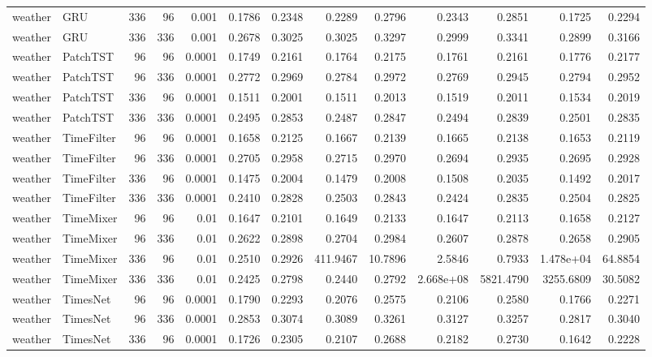 \begin{longtable}{@{}llrrr*{8}{r}@{}}
weather & GRU & 336 & 96 & 0.001 & 0.1786 & 0.2348 & 0.2289 & 0.2796 & 0.2343 & 0.2851 & 0.1725 & 0.2294 \\
weather & GRU & 336 & 336 & 0.001 & 0.2678 & 0.3025 & 0.3025 & 0.3297 & 0.2999 & 0.3341 & 0.2899 & 0.3166 \\
weather & PatchTST & 96 & 96 & 0.0001 & 0.1749 & 0.2161 & 0.1764 & 0.2175 & 0.1761 & 0.2161 & 0.1776 & 0.2177 \\
weather & PatchTST & 96 & 336 & 0.0001 & 0.2772 & 0.2969 & 0.2784 & 0.2972 & 0.2769 & 0.2945 & 0.2794 & 0.2952 \\
weather & PatchTST & 336 & 96 & 0.0001 & 0.1511 & 0.2001 & 0.1511 & 0.2013 & 0.1519 & 0.2011 & 0.1534 & 0.2019 \\
weather & PatchTST & 336 & 336 & 0.0001 & 0.2495 & 0.2853 & 0.2487 & 0.2847 & 0.2494 & 0.2839 & 0.2501 & 0.2835 \\
weather & TimeFilter & 96 & 96 & 0.0001 & 0.1658 & 0.2125 & 0.1667 & 0.2139 & 0.1665 & 0.2138 & 0.1653 & 0.2119 \\
weather & TimeFilter & 96 & 336 & 0.0001 & 0.2705 & 0.2958 & 0.2715 & 0.2970 & 0.2694 & 0.2935 & 0.2695 & 0.2928 \\
weather & TimeFilter & 336 & 96 & 0.0001 & 0.1475 & 0.2004 & 0.1479 & 0.2008 & 0.1508 & 0.2035 & 0.1492 & 0.2017 \\
weather & TimeFilter & 336 & 336 & 0.0001 & 0.2410 & 0.2828 & 0.2503 & 0.2843 & 0.2424 & 0.2835 & 0.2504 & 0.2825 \\
weather & TimeMixer & 96 & 96 & 0.01 & 0.1647 & 0.2101 & 0.1649 & 0.2133 & 0.1647 & 0.2113 & 0.1658 & 0.2127 \\
weather & TimeMixer & 96 & 336 & 0.01 & 0.2622 & 0.2898 & 0.2704 & 0.2984 & 0.2607 & 0.2878 & 0.2658 & 0.2905 \\
weather & TimeMixer & 336 & 96 & 0.01 & 0.2510 & 0.2926 & 411.9467 & 10.7896 & 2.5846 & 0.7933 & 1.478e+04 & 64.8854 \\
weather & TimeMixer & 336 & 336 & 0.01 & 0.2425 & 0.2798 & 0.2440 & 0.2792 & 2.668e+08 & 5821.4790 & 3255.6809 & 30.5082 \\
weather & TimesNet & 96 & 96 & 0.0001 & 0.1790 & 0.2293 & 0.2076 & 0.2575 & 0.2106 & 0.2580 & 0.1766 & 0.2271 \\
weather & TimesNet & 96 & 336 & 0.0001 & 0.2853 & 0.3074 & 0.3089 & 0.3261 & 0.3127 & 0.3257 & 0.2817 & 0.3040 \\
weather & TimesNet & 336 & 96 & 0.0001 & 0.1726 & 0.2305 & 0.2107 & 0.2688 & 0.2182 & 0.2730 & 0.1642 & 0.2228 \\

\end{longtable}
